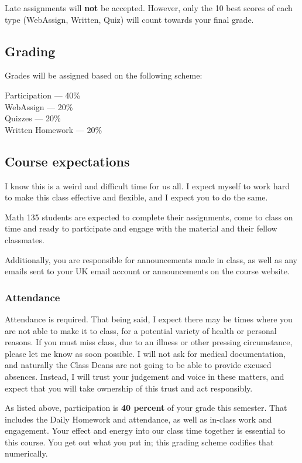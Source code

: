 \documentclass[11pt]{amsart}
\begin{document}
Late assignments will \textbf{not} be accepted.
However, only the 10 best scores of each type (WebAssign, Written, Quiz) will count towards your final grade.



\subsection*{Grading}
Grades will be assigned based on the following scheme:
\begin{multicols}{2}
      Participation  --- 40\% \\
      WebAssign --- 20\% \\
      Quizzes --- 20\%\\
      Written Homework --- 20\%
\end{multicols}


\subsection*{Course expectations}
I know this is a weird and difficult time for us all.
I expect myself to work hard to make this class effective and flexible, and I expect you to do the same.

Math 135 students are expected to complete their assignments, come to class on time and ready to participate and engage with the material and their fellow classmates.

Additionally, you are responsible for announcements made in class, as well as any emails sent to your UK email account or announcements on the course website.

\subsubsection*{Attendance}
Attendance is required.
That being said, I expect there may be times where you are not able to make it to class,
for a potential variety of health or personal reasons.
If you must miss class, due to an illness or other pressing circumstance, please let me know as soon possible.
I will not ask for medical documentation, and naturally the Class Deans are not going to be able to provide excused absences.
Instead, I will trust your judgement and voice in these matters,
and expect that you will take ownership of this trust and act responsibly.

As listed above, participation is \textbf{40 percent} of your grade this semester.
That includes the Daily Homework and attendance, as well as in-class work and engagement.
Your effect and energy into our class time together is essential to this course.
You get out what you put in; this grading scheme codifies that numerically.
\end{document}
